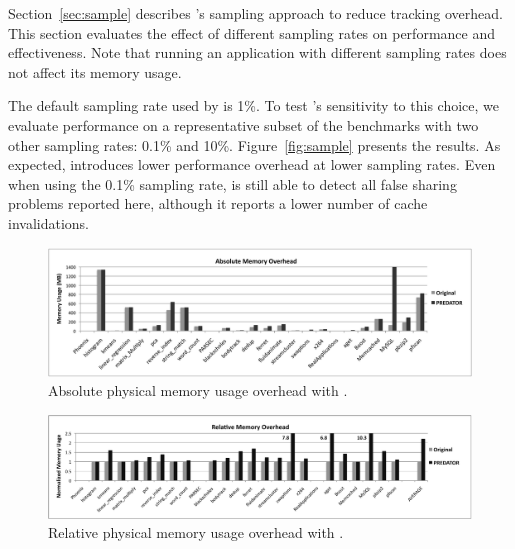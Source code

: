 Section~\ref{sec:sample} describes \Predator{}'s sampling approach to reduce tracking overhead. This section evaluates the effect of different sampling rates on performance and effectiveness. Note that running an application with different sampling rates does not affect its memory usage.

The default sampling rate used by \Predator{} is 1\%. To test \Predator{}'s sensitivity to this choice, we evaluate performance on a representative subset of the benchmarks with two other sampling rates: 0.1\% and 10\%. Figure~\ref{fig:sample} presents the results. As expected, \Predator{} introduces lower performance overhead at lower sampling rates. Even when using the 0.1\% sampling rate, \Predator{} is still able to detect all false sharing problems reported here, although it reports a lower number of cache invalidations.

\begin{figure}[!t]
\centering
\includegraphics[width=6in]{fig/absolutememory}
\caption{Absolute physical memory usage overhead with \Predator{}.}
\label{fig:absolutememusage}
\end{figure}

\begin{figure}[!t]
\centering
\includegraphics[width=6in]{fig/memusage}
\caption{Relative physical memory usage overhead with \Predator{}.}
\label{fig:memusage}
\end{figure}
 


